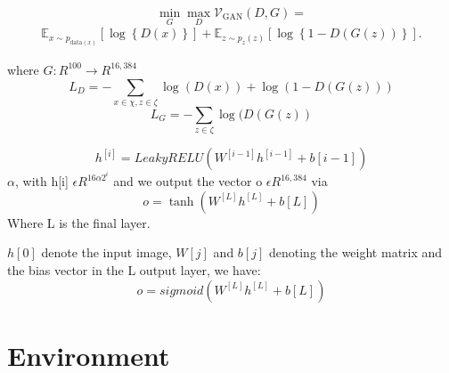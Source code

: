 \documentclass[conference]{IEEEtran}
\begin{document}
\begin{equation}
\min_{G}\max_{D}\mathcal V_{\text{GAN}}\left(D, G \right) = \end{equation}
\begin{align*}
 \mathbb E_{x \sim p_{\text{data}\left( x\right) }}\left[ \log \left\{ D\left( x \right) \right\} \right] + \mathbb E_{z\sim p_{z}\left( z\right)}\left[ \log\left\{ 1 - D\left( G\left( z\right) \right) \right\}\right].   
\end{align*}

where \begin{math}G : R^{100} \longrightarrow R^{16,384}\end{math}
\begin{equation}
L_D = - \sum_{x \in \chi, z \in \zeta} \log(D(x)) + \log(1 - D(G(z))) \tag{6}
\end{equation}
\begin{equation}
L_G = - \sum_{z \in \zeta} \log(D(G(z)) \tag{7}
\end{equation}


\begin{equation}
h^{[i]} = LeakyRELU(W^{[i-1]}h^{[i-1]}+b{[i-1]})\label{Gen LeakyRELU}
\end{equation}
\begin{math}\alpha \end{math}, with h[i] \begin{math}\epsilon R^{16\alpha2^i}\end{math} and we output the vector o \begin{math}\epsilon R^{16,384}\end{math} via
\begin{equation}
o =\tanh(W^{[L]}h^{[L]}+b{[L]})
\end{equation}
Where L is the final layer.

\begin{math}h[0]\end{math} denote the input
image, \begin{math}W [j]\end{math} and \begin{math}b[j]\end{math} denoting the weight matrix and the bias vector in the L output layer, we have:
\begin{equation}
o = sigmoid(W^{[L]}h^{[L]}+b{[L]})
\end{equation}


\section{Environment}
\end{document}
